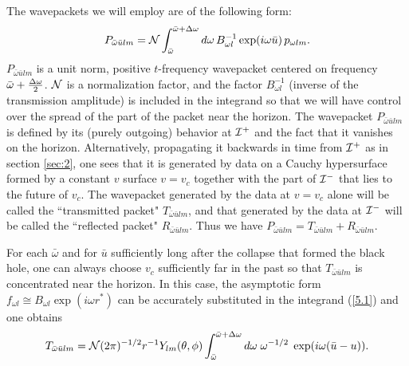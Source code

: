 \documentclass[12pt]{article}
\def\o{\omega}
\def\obar{\bar{\omega}}
\def\ubar{\bar{u}}
\def\pastI{{\cal I}^-}
\def\futI{{\cal I}^+}
\begin{document}
The wavepackets we will employ are of the following form:
\begin{equation}
P_{\obar\ubar lm}=
{\cal N}
\int_{\obar}^{\obar+\Delta\o} d\o
\, B_{\o l}^{-1}
\exp(i\o\ubar)\, p_{\o lm}.
\label{5.1}
\end{equation}
$P_{\obar\ubar lm}$ is a unit norm, positive
$t$-frequency wavepacket centered on frequency $\obar+{\Delta\o\over2}$.
${\cal N}$ is a normalization factor, and
the factor $B_{\o l}^{-1}$ (inverse of the transmission
amplitude) is included in the integrand so that we
will have control over the spread of the part of the packet
near the horizon. The wavepacket $P_{\obar\ubar lm}$ is defined by
its (purely outgoing) behavior at $\futI$
and the fact that it vanishes on
the horizon. Alternatively, propagating it backwards in time from
$\futI$ as in section \ref{sec:2},
one sees that it is generated by data on a Cauchy hypersurface formed
by a constant $v$ surface $v=v_c$ together with the part of
$\pastI$ that lies to the future of $v_c$. The wavepacket
generated by the data at $v=v_c$ alone will be called the
``transmitted packet" $T_{\obar\ubar lm}$, and that
generated by the data at $\pastI$ will be called the
``reflected packet" $R_{\obar\ubar lm}$. Thus we have
$P_{\obar\ubar lm}=
T_{\obar\ubar lm}+R_{\obar\ubar lm}$.

For each $\obar$ and for $\ubar$ sufficiently long after the
collapse that formed the black hole, one can always choose
$v_c$ sufficiently far in the past so that
$T_{\obar\ubar lm}$ is concentrated near the horizon. In
this case, the asymptotic form
$f_{\o l}\cong B_{\o l}\exp(i\o r^*)$
can be accurately substituted in the integrand
(\ref{5.1}) and one obtains
\begin{equation}
T_{\obar\ubar lm}={\cal N}
(2\pi)^{-1/2} r^{-1}Y_{lm}(\theta,\phi)
\int_{\obar}^{\obar+\Delta\o} d\o \; \o^{-1/2}\;
\exp(i\o(\ubar-u)).
\label{5.11}
\end{equation}
\end{document}
